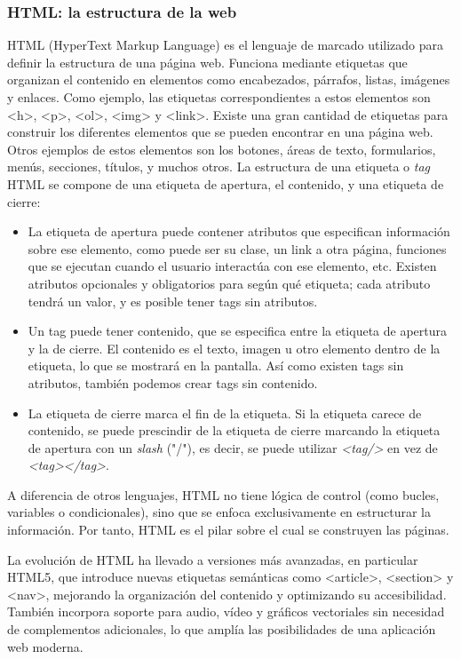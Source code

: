 \subsubsection{HTML: la estructura de la web}
HTML (HyperText Markup Language) es el lenguaje de marcado utilizado para definir la estructura de una página web. Funciona mediante etiquetas que organizan el contenido en elementos como encabezados, párrafos, listas, imágenes y enlaces. Como ejemplo, las etiquetas correspondientes a estos elementos son <h>, <p>, <ol>, <img> y <link>. Existe una gran cantidad de etiquetas para construir los diferentes elementos que se pueden encontrar en una página web. Otros ejemplos de estos elementos son los botones, áreas de texto, formularios, menús, secciones, títulos, y muchos otros.
La estructura de una etiqueta o \textit{tag} HTML se compone de una etiqueta de apertura, el contenido, y una etiqueta de cierre:
    \begin{itemize}
        \item La etiqueta de apertura puede contener atributos que especifican información sobre ese elemento, como puede ser su clase, un link a otra página, funciones que se ejecutan cuando el usuario interactúa con ese elemento, etc. Existen atributos opcionales y obligatorios para según qué etiqueta; cada atributo tendrá un valor, y es posible tener tags sin atributos.
        \item Un tag puede tener contenido, que se especifica entre la etiqueta de apertura y la de cierre. El contenido es el texto, imagen u otro elemento dentro de la etiqueta, lo que se mostrará en la pantalla. Así como existen tags sin atributos, también podemos crear tags sin contenido.
        \item La etiqueta de cierre marca el fin de la etiqueta. Si la etiqueta carece de contenido, se puede prescindir de la etiqueta de cierre marcando la etiqueta de apertura con un \textit{slash} ("/"), es decir, se puede utilizar \textit{<tag/>} en vez de \textit{<tag></tag>}.
    \end{itemize}


A diferencia de otros lenguajes, HTML no tiene lógica de control (como bucles, variables o condicionales), sino que se enfoca exclusivamente en estructurar la información. Por tanto, HTML es el pilar sobre el cual se construyen las páginas.

La evolución de HTML ha llevado a versiones más avanzadas, en particular HTML5, que introduce nuevas etiquetas semánticas como <article>, <section> y <nav>, mejorando la organización del contenido y optimizando su accesibilidad. También incorpora soporte para audio, vídeo y gráficos vectoriales sin necesidad de complementos adicionales, lo que amplía las posibilidades de una aplicación web moderna.\cite{html_universidad_europea}


